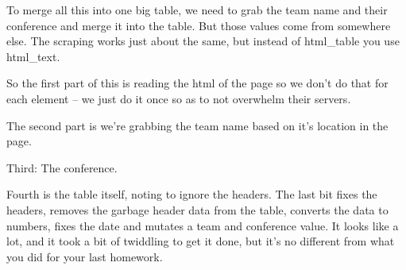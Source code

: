 \documentclass[]{book}
\begin{document}
To merge all this into one big table, we need to grab the team name and their conference and merge it into the table. But those values come from somewhere else. The scraping works just about the same, but instead of html\_table you use html\_text.

So the first part of this is reading the html of the page so we don't do that for each element -- we just do it once so as to not overwhelm their servers.

The second part is we're grabbing the team name based on it's location in the page.

Third: The conference.

Fourth is the table itself, noting to ignore the headers. The last bit fixes the headers, removes the garbage header data from the table, converts the data to numbers, fixes the date and mutates a team and conference value. It looks like a lot, and it took a bit of twiddling to get it done, but it's no different from what you did for your last homework.
\end{document}
